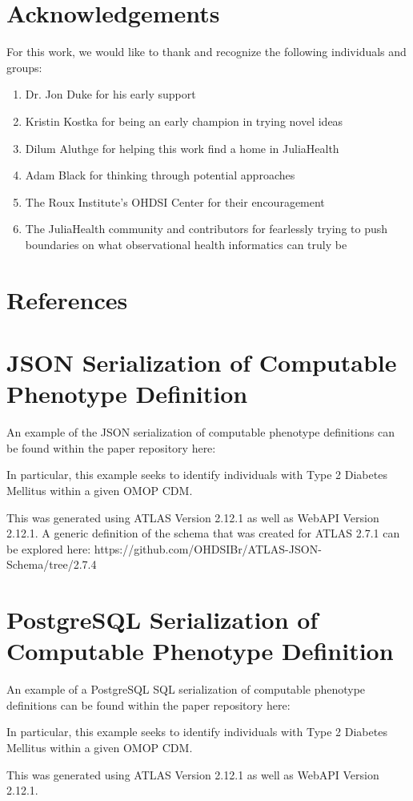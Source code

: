 \documentclass{juliacon}
\begin{document}
\section{Acknowledgements}

For this work, we would like to thank and recognize the following individuals and groups: 

\begin{enumerate}

  \item Dr. Jon Duke for his early support
  \item Kristin Kostka for being an early champion in trying novel ideas
  \item Dilum Aluthge for helping this work find a home in JuliaHealth
  \item Adam Black for thinking through potential approaches
  \item The Roux Institute's OHDSI Center for their encouragement
  \item The JuliaHealth community and contributors for fearlessly trying to push boundaries on what observational health informatics can truly be

\end{enumerate}

\section{References}

\appendix

\section{JSON Serialization of Computable Phenotype Definition}\label{appendix:json}

An example of the JSON serialization of computable phenotype definitions can be found within the paper repository here:

In particular, this example seeks to identify individuals with Type 2 Diabetes Mellitus within a given OMOP CDM.

This was generated using ATLAS Version 2.12.1 as well as 
WebAPI Version 2.12.1.
A generic definition of the schema that was created for ATLAS 2.7.1 can be explored here: https://github.com/OHDSIBr/ATLAS-JSON-Schema/tree/2.7.4

\section{PostgreSQL Serialization of Computable Phenotype Definition}\label{appendix:postgresql}

An example of a PostgreSQL SQL serialization of computable phenotype definitions can be found within the paper repository here:

In particular, this example seeks to identify individuals with Type 2 Diabetes Mellitus within a given OMOP CDM.

This was generated using ATLAS Version 2.12.1 as well as 
WebAPI Version 2.12.1.


\end{document}
